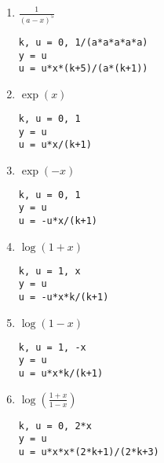 \documentclass[11pt,a4paper]{article}
\begin{document}
\begin{enumerate}
\item $\displaystyle \frac{1}{(a-x)^5}$
\hfill
\begin{minipage}[t]{9cm}\footnotesize
\begin{Verbatim}
k, u = 0, 1/(a*a*a*a*a)
y = u
u = u*x*(k+5)/(a*(k+1))
\end{Verbatim}
\end{minipage}
\vspace*{3mm}


\item $\displaystyle \exp(x)$
\hfill
\begin{minipage}[t]{9cm}\footnotesize
\begin{Verbatim}
k, u = 0, 1
y = u
u = u*x/(k+1)
\end{Verbatim}
\end{minipage}
\vspace*{3mm}


\item $\displaystyle \exp(-x)$
\hfill
\begin{minipage}[t]{9cm}\footnotesize
\begin{Verbatim}
k, u = 0, 1
y = u
u = -u*x/(k+1)
\end{Verbatim}
\end{minipage}
\vspace*{3mm}


\item $\displaystyle\log(1+x)$
\hfill
\begin{minipage}[t]{9cm}\footnotesize
\begin{Verbatim}
k, u = 1, x
y = u
u = -u*x*k/(k+1)
\end{Verbatim}
\end{minipage}
\vspace*{3mm}

\item $\displaystyle\log(1-x)$
\hfill
\begin{minipage}[t]{9cm}\footnotesize
\begin{Verbatim}
k, u = 1, -x
y = u
u = u*x*k/(k+1)
\end{Verbatim}
\end{minipage}
\vspace*{3mm}


\item $\displaystyle\log\left(\frac{1+x}{1-x}\right)$
\hfill
\begin{minipage}[t]{9cm}\footnotesize
\begin{Verbatim}
k, u = 0, 2*x
y = u
u = u*x*x*(2*k+1)/(2*k+3)
\end{Verbatim}
\end{minipage}
\vspace*{3mm}



\end{enumerate}
\end{document}
